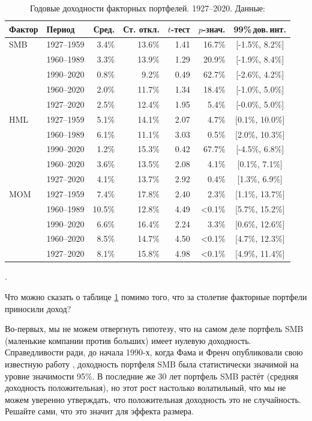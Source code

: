 \begin{table}[h]
\centering
\begin{tabular}{l|l|r|r|r|r|c}
Фактор & Период & Сред. & Ст. откл. & $t$-тест & $p$-знач. & 99\%\,дов.\,инт. \\
\hline
SMB & 1927--1959 &  3.4\% & 13.6\% & 1.41 & 16.7\% & [-1.5\%, 8.2\%] \\
    & 1960--1989 &  3.3\% & 13.9\% & 1.29 & 20.9\% & [-1.9\%, 8.4\%] \\
    & 1990--2020 &  0.8\% & 9.2\%  & 0.49 & 62.7\% & [-2.6\%, 4.2\%] \\
    & 1960--2020 &  2.0\% & 11.7\% & 1.34 & 18.4\% & [-1.0\%, 5.0\%] \\
    & 1927--2020 &  2.5\% & 12.4\% & 1.95 &  5.4\% & [-0.0\%, 5.0\%] \\ \hline

HML & 1927--1959 &  5.1\% & 14.1\% & 2.07 &  4.7\% & [0.1\%, 10.0\%] \\
    & 1960--1989 &  6.1\% & 11.1\% & 3.03 &  0.5\% & [2.0\%, 10.3\%] \\
    & 1990--2020 &  1.2\% & 15.3\% & 0.42 & 67.7\% & [-4.5\%, 6.8\%] \\
    & 1960--2020 &  3.6\% & 13.5\% & 2.08 &  4.1\% & [0.1\%, 7.1\%]  \\
    & 1927--2020 &  4.1\% & 13.7\% & 2.92 &  0.4\% & [1.3\%, 6.9\%]  \\ \hline
  
MOM & 1927--1959 &  7.4\% & 17.8\% & 2.40 &  2.3\% & [1.1\%, 13.7\%] \\
    & 1960--1989 & 10.5\% & 12.8\% & 4.49 & <0.1\% & [5.7\%, 15.2\%] \\
    & 1990--2020 &  6.6\% & 16.4\% & 2.24 &  3.3\% & [0.6\%, 12.6\%] \\
    & 1960--2020 &  8.5\% & 14.7\% & 4.50 & <0.1\% & [4.7\%, 12.3\%] \\
    & 1927--2020 &  8.1\% & 15.8\% & 4.98 & <0.1\% & [4.9\%, 11.4\%] \\
\end{tabular}
\caption{Годовые доходности факторных портфелей. 1927--2020. Данные: \cite{kennethFrench}}.
\label{us_factor_returns_table}
\end{table}

Что можно сказать о таблице \ref{us_factor_returns_table} помимо того, что за столетие факторные портфели приносили доход?

Во-первых, мы не можем отвергнуть гипотезу, что на самом деле портфель SMB (маленькие компании против больших) имеет нулевую доходность. Справедливости ради, до начала 1990-х, когда Фама и Френч опубликовали свою известную работу \cite{Fama93commonrisk}, доходность портфеля SMB была статистически значимой на уровне значимости 95\%. В последние же 30 лет портфель SMB растёт (средняя доходность положительная), но этот рост настолько волатильный, что мы не можем уверенно утверждать, что положительная доходность это не случайность. Решайте сами, что это значит для эффекта размера.

